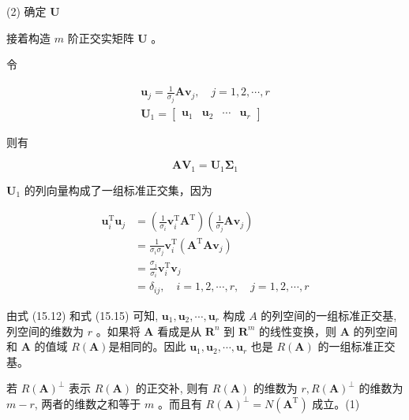 \documentclass[10pt]{article}
\begin{document}
(2) 确定 $\boldsymbol{U}$

接着构造 $m$ 阶正交实矩阵 $\boldsymbol{U}$ 。

令


\begin{gather*}
\boldsymbol{u}_{j}=\frac{1}{\sigma_{j}} \boldsymbol{A} \boldsymbol{v}_{j}, \quad j=1,2, \cdots, r  \tag{15.12}\\
\boldsymbol{U}_{1}=\left[\begin{array}{llll}
\boldsymbol{u}_{1} & \boldsymbol{u}_{2} & \cdots & \boldsymbol{u}_{r}
\end{array}\right] \tag{15.13}
\end{gather*}


则有


\begin{equation*}
\boldsymbol{A} \boldsymbol{V}_{1}=\boldsymbol{U}_{1} \boldsymbol{\Sigma}_{1} \tag{15.14}
\end{equation*}


$\boldsymbol{U}_{1}$ 的列向量构成了一组标准正交集，因为


\begin{align*}
\boldsymbol{u}_{i}^{\mathrm{T}} \boldsymbol{u}_{j} & =\left(\frac{1}{\sigma_{i}} \boldsymbol{v}_{i}^{\mathrm{T}} \boldsymbol{A}^{\mathrm{T}}\right)\left(\frac{1}{\sigma_{j}} \boldsymbol{A} \boldsymbol{v}_{j}\right) \\
& =\frac{1}{\sigma_{i} \sigma_{j}} \boldsymbol{v}_{i}^{\mathrm{T}}\left(\boldsymbol{A}^{\mathrm{T}} \boldsymbol{A} \boldsymbol{v}_{j}\right) \\
& =\frac{\sigma_{j}}{\sigma_{i}} \boldsymbol{v}_{i}^{\mathrm{T}} \boldsymbol{v}_{j} \\
& =\delta_{i j}, \quad i=1,2, \cdots, r, \quad j=1,2, \cdots, r \tag{15.15}
\end{align*}


由式 (15.12) 和式 (15.15) 可知, $\boldsymbol{u}_{1}, \boldsymbol{u}_{2}, \cdots, \boldsymbol{u}_{r}$ 构成 $A$ 的列空间的一组标准正交基, 列空间的维数为 $r$ 。如果将 $\boldsymbol{A}$ 看成是从 $\boldsymbol{R}^{n}$ 到 $\boldsymbol{R}^{m}$ 的线性变换，则 $\boldsymbol{A}$ 的列空间和 $\boldsymbol{A}$ 的值域 $R(\boldsymbol{A})$是相同的。因此 $\boldsymbol{u}_{1}, \boldsymbol{u}_{2}, \cdots, \boldsymbol{u}_{r}$ 也是 $R(\boldsymbol{A})$ 的一组标准正交基。

若 $R(\boldsymbol{A})^{\perp}$ 表示 $R(\boldsymbol{A})$ 的正交补, 则有 $R(\boldsymbol{A})$ 的维数为 $r, R(\boldsymbol{A})^{\perp}$ 的维数为 $m-r$, 两者的维数之和等于 $m$ 。而且有 $R(\boldsymbol{A})^{\perp}=N\left(\boldsymbol{A}^{\mathrm{T}}\right)$ 成立。(1)
\end{document}
